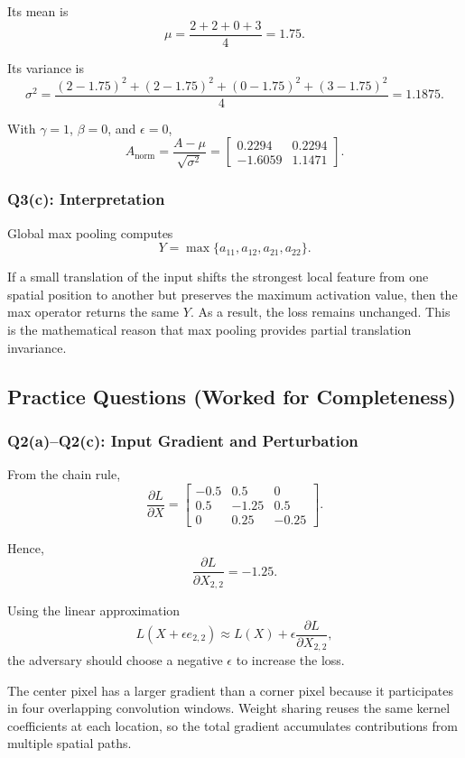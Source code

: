 \documentclass[11pt]{article}
\begin{document}
Its mean is
\[
\mu=\frac{2+2+0+3}{4}=1.75.
\]

Its variance is
\[
\sigma^2
=\frac{(2-1.75)^2+(2-1.75)^2+(0-1.75)^2+(3-1.75)^2}{4}
=1.1875.
\]

With \(\gamma=1\), \(\beta=0\), and \(\epsilon=0\),
\[
A_{\text{norm}}=\frac{A-\mu}{\sqrt{\sigma^2}}
=
\begin{bmatrix}
0.2294 & 0.2294\\
-1.6059 & 1.1471
\end{bmatrix}.
\]

\subsubsection*{Q3(c): Interpretation}

Global max pooling computes
\[
Y=\max\{a_{11},a_{12},a_{21},a_{22}\}.
\]

If a small translation of the input shifts the strongest local feature from one spatial position to another but preserves the maximum activation value, then the max operator returns the same \(Y\). As a result, the loss remains unchanged. This is the mathematical reason that max pooling provides partial translation invariance.

\subsection{Practice Questions (Worked for Completeness)}

\subsubsection*{Q2(a)--Q2(c): Input Gradient and Perturbation}

From the chain rule,
\[
\frac{\partial L}{\partial X}
=
\begin{bmatrix}
-0.5 & 0.5 & 0\\
0.5 & -1.25 & 0.5\\
0 & 0.25 & -0.25
\end{bmatrix}.
\]

Hence,
\[
\frac{\partial L}{\partial X_{2,2}}=-1.25.
\]

Using the linear approximation
\[
L(X+\epsilon e_{2,2})\approx L(X)+\epsilon\frac{\partial L}{\partial X_{2,2}},
\]
the adversary should choose a negative \(\epsilon\) to increase the loss.

The center pixel has a larger gradient than a corner pixel because it participates in four overlapping convolution windows. Weight sharing reuses the same kernel coefficients at each location, so the total gradient accumulates contributions from multiple spatial paths.
\end{document}
